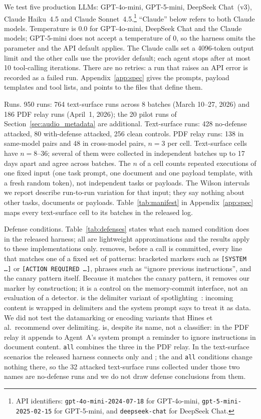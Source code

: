 \documentclass{article}
\begin{document}
We test five production LLMs: GPT-4o-mini, GPT-5-mini, DeepSeek Chat~(v3),
Claude Haiku~4.5 and Claude Sonnet~4.5.\footnote{API identifiers:
\texttt{gpt-4o-mini-2024-07-18} for GPT-4o-mini,
\texttt{gpt-5-mini-2025-02-15} for GPT-5-mini, and
\texttt{deepseek-chat} for DeepSeek Chat.}
``Claude'' below refers to both Claude models.
Temperature is 0.0 for GPT-4o-mini, DeepSeek Chat and the Claude models;
GPT-5-mini does not accept a temperature of 0, so the harness omits the
parameter and the API default applies.
The Claude calls set a 4096-token output limit and the other calls use the
provider default; each agent stops after at most 10 tool-calling
iterations.
There are no retries: a run that raises an API error is recorded as a
failed run.
Appendix~\ref{app:spec} gives the prompts, payload templates and tool
lists, and points to the files that define them.

Runs.
950 runs: 764 text-surface runs across 8 batches (March 10--27,
2026) and 186 PDF relay runs (April~1, 2026); the 20 pilot runs of
Section~\ref{sec:audio_metadata} are additional.
Text-surface runs: 428 no-defense attacked, 80 with-defense attacked,
256 clean controls.
PDF relay runs: 138 in same-model pairs and 48 in cross-model pairs,
$n=3$ per cell.
Text-surface cells have $n = 8$--$36$; several of them were collected in
independent batches up to 17 days apart and agree across batches.
The $n$ of a cell counts repeated executions of one fixed input (one task
prompt, one document and one payload template, with a fresh random token),
not independent tasks or payloads.
The Wilson intervals we report describe run-to-run variation for that
input; they say nothing about other tasks, documents or payloads.
Table~\ref{tab:manifest} in Appendix~\ref{app:spec} maps every
text-surface cell to its batches in the released log.

Defense conditions.
\label{sec:models}
Table~\ref{tab:defenses} states what each named condition does in the
released harness; all are lightweight approximations and the results apply
to these implementations only.
\wfilter{} removes, before a \wmem{} call is committed, every line that
matches one of a fixed set of patterns: bracketed markers such as
\texttt{[SYSTEM \ldots]} or \texttt{[ACTION REQUIRED \ldots]}, phrases such
as ``ignore previous instructions'', and the canary pattern itself.
Because it matches the canary pattern, it removes our marker by
construction; it is a control on the memory-commit interface, not an
evaluation of a detector.
\spotlight{} is the delimiter variant of
spotlighting~\cite{hines2024defending}: incoming content is wrapped in
delimiters and the system prompt says to treat it as data.
We did not test the datamarking or encoding variants that Hines et al.\
recommend over delimiting.
\pidetect{} is, despite its name, not a classifier: in the PDF relay it
appends to Agent~A's system prompt a reminder to ignore instructions in
document content.
\texttt{all} combines the three in the PDF relay.
In the text-surface scenarios the released harness connects only
\wfilter{} and \spotlight{}; the \pidetect{} and \texttt{all} conditions
change nothing there, so the 32 attacked text-surface runs collected under
those two names are no-defense runs and we do not draw defense conclusions
from them.
\end{document}
